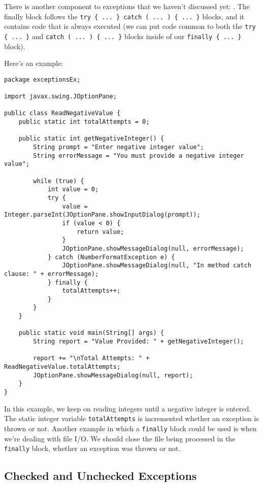 There is another component to exceptions that we haven't discussed yet: . The finally block follows the \verb!try { ... } catch ( ... ) { ... }! blocks, and it contains code that is always executed (we can put code common to both the \verb!try { ... }! and \verb!catch ( ... ) { ... }! blocks inside of our \verb!finally { ... }! block).

Here's an example:

\begin{lstlisting}
package exceptionsEx;

import javax.swing.JOptionPane;

public class ReadNegativeValue {
	public static int totalAttempts = 0;
	
	public static int getNegativeInteger() {
		String prompt = "Enter negative integer value";
		String errorMessage = "You must provide a negative integer value";
		
		while (true) {
			int value = 0;
			try {
				value = Integer.parseInt(JOptionPane.showInputDialog(prompt));
				if (value < 0) {
					return value;
				}
				JOptionPane.showMessageDialog(null, errorMessage);
			} catch (NumberFormatException e) {
				JOptionPane.showMessageDialog(null, "In method catch clause: " + errorMessage);
			} finally {
				totalAttempts++;
			}
		}
	}

	public static void main(String[] args) {
		String report = "Value Provided: " + getNegativeInteger();
		
		report += "\nTotal Attempts: " + ReadNegativeValue.totalAttempts;
		JOptionPane.showMessageDialog(null, report);
	}
}
\end{lstlisting}

In this example, we keep on reading integers until a negative integer is entered. The static integer variable \verb!totalAttempts! is incremented whether an exception is thrown or not. Another example in which a \verb!finally! block could be used is when we're dealing with file I/O. We should close the file being processed in the \verb!finally! block, whether an exception was thrown or not.

\subsection{Checked and Unchecked Exceptions}



